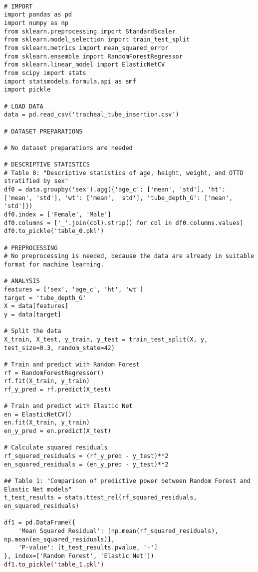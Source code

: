 \documentclass[11pt]{article}
\begin{document}
\begin{verbatim}

# IMPORT
import pandas as pd
import numpy as np
from sklearn.preprocessing import StandardScaler
from sklearn.model_selection import train_test_split
from sklearn.metrics import mean_squared_error
from sklearn.ensemble import RandomForestRegressor
from sklearn.linear_model import ElasticNetCV
from scipy import stats
import statsmodels.formula.api as smf
import pickle

# LOAD DATA
data = pd.read_csv('tracheal_tube_insertion.csv')

# DATASET PREPARATIONS

# No dataset preparations are needed

# DESCRIPTIVE STATISTICS
# Table 0: "Descriptive statistics of age, height, weight, and OTTD stratified by sex"
df0 = data.groupby('sex').agg({'age_c': ['mean', 'std'], 'ht': ['mean', 'std'], 'wt': ['mean', 'std'], 'tube_depth_G': ['mean', 'std']})
df0.index = ['Female', 'Male']   
df0.columns = ['_'.join(col).strip() for col in df0.columns.values]
df0.to_pickle('table_0.pkl')

# PREPROCESSING
# No preprocessing is needed, because the data are already in suitable format for machine learning.

# ANALYSIS
features = ['sex', 'age_c', 'ht', 'wt']
target = 'tube_depth_G'
X = data[features]
y = data[target]

# Split the data
X_train, X_test, y_train, y_test = train_test_split(X, y, test_size=0.3, random_state=42)

# Train and predict with Random Forest
rf = RandomForestRegressor()
rf.fit(X_train, y_train)
rf_y_pred = rf.predict(X_test)

# Train and predict with Elastic Net
en = ElasticNetCV()
en.fit(X_train, y_train)
en_y_pred = en.predict(X_test)

# Calculate squared residuals
rf_squared_residuals = (rf_y_pred - y_test)**2
en_squared_residuals = (en_y_pred - y_test)**2

## Table 1: "Comparison of predictive power between Random Forest and Elastic Net models"
t_test_results = stats.ttest_rel(rf_squared_residuals, en_squared_residuals)

df1 = pd.DataFrame({
    'Mean Squared Residual': [np.mean(rf_squared_residuals), np.mean(en_squared_residuals)],
    'P-value': [t_test_results.pvalue, '-']
}, index=['Random Forest', 'Elastic Net'])
df1.to_pickle('table_1.pkl')


\end{verbatim}
\end{document}
